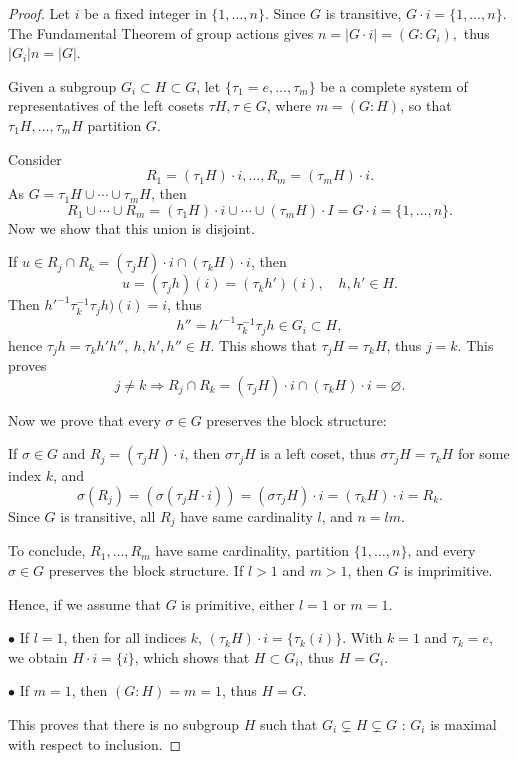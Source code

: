 \documentclass[11pt,a4paper]{article}
\begin{document}
\begin{proof}

Let $i$ be a fixed integer in $\{1,\ldots,n\}$. Since $G$ is transitive, $G\cdot i = \{1,\ldots,n\}$. The Fundamental Theorem of group actions gives
$n = |G\cdot i| = (G:G_i),$
thus $|G_i| n = |G|$.

Given a subgroup $G_i \subset H \subset G$, let $\{\tau_1=e,\ldots,\tau_m\}$ be a complete system of representatives of the left cosets $\tau H, \tau \in G$, where $m = (G:H)$, so that $\tau_1H,\ldots,\tau_mH$ partition $G$.

Consider
$$R_1 = (\tau_1H)\cdot i,\ldots,R_m = (\tau_m H)\cdot i.$$
As $G =\tau_1H \cup \cdots \cup \tau_m H$, then
$$R_1 \cup \cdots\cup R_m = (\tau_1H)\cdot i \cup \cdots \cup (\tau_mH)\cdot I =  G\cdot i = \{1,\ldots,n\}.$$
Now we show that this union is disjoint.

If $u \in R_j \cap R_k = (\tau_j H)\cdot i \cap (\tau_kH)\cdot i$, then
$$u = (\tau_j h)(i) = (\tau_k h')(i),\quad h,h'\in H.$$
Then $h'^{-1}\tau_k^{-1} \tau_j h)(i) = i$, thus
$$h'' = h'^{-1} \tau_k^{-1} \tau_j h \in G_i \subset H,$$
hence $\tau_j h = \tau_k h'h'',\ h,h',h'' \in H$. This shows that $\tau_j H =\tau_k H$, thus $j=k$. This proves
$$j \ne k \Rightarrow R_j \cap R_k = (\tau_j H)\cdot i \cap (\tau_kH)\cdot i = \varnothing.$$

Now we prove that every $\sigma \in G$ preserves the block structure:

If $\sigma \in G$ and $R_j = (\tau_j H)\cdot i$, then $\sigma \tau_j H$ is a left coset, thus $\sigma \tau_j H = \tau_k H$ for some index $k$, and
$$\sigma(R_j) =  (\sigma (\tau_j H \cdot i)) = (\sigma \tau_j H)\cdot i = (\tau_kH)\cdot i = R_k.$$
Since $G$ is transitive, all $R_j$ have same cardinality $l$, and $n = l m$.

To conclude, $R_1,\ldots,R_m$ have same cardinality, partition $\{1,\ldots,n\}$, and every $\sigma \in G$ preserves the block structure. If $l>1$ and $m>1$, then $G$ is imprimitive.

Hence, if we assume that $G$ is primitive, either $l= 1$ or $m=1$.

$\bullet$ If $l=1$, then for all indices $k$,  $(\tau_k H) \cdot i = \{\tau_k(i)\}$. With $k=1$ and $\tau_k = e$, we obtain $H\cdot i = \{i\}$, which shows that $H \subset G_i$, thus $H = G_i$.

$\bullet$ If $m=1$, then $(G:H) = m = 1$, thus $H = G$.

This proves that there is no subgroup $H$ such that $G_i \subsetneq H \subsetneq G$ : $G_i$ is maximal with respect to inclusion.


\end{proof}
\end{document}
